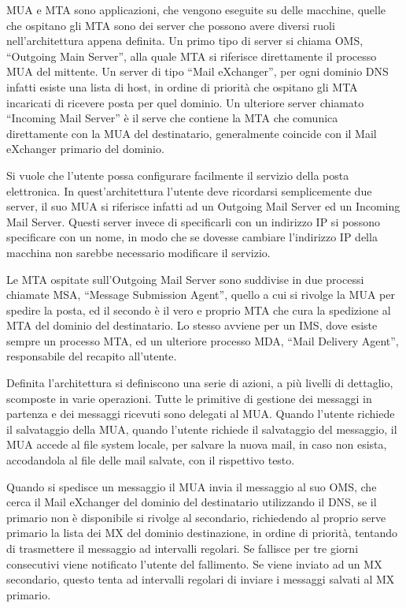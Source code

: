 \documentclass{article}
\numberwithin{equation}{subsection}
\begin{document}
MUA e MTA sono applicazioni, che vengono eseguite su delle macchine, quelle che ospitano gli MTA sono dei server che possono avere diversi ruoli nell'architettura appena definita. Un primo tipo di server si chiama OMS, ``Outgoing Main Server'', alla quale MTA si riferisce direttamente il processo MUA del mittente. 
Un server di tipo ``Mail eXchanger'', per ogni dominio DNS infatti esiste una lista di host, in ordine di priorità che ospitano gli MTA incaricati di ricevere posta per quel dominio. 
Un ulteriore server chiamato ``Incoming Mail Server'' è il serve che contiene la MTA che comunica direttamente con la MUA del destinatario, generalmente coincide con il Mail eXchanger primario del dominio. 

Si vuole che l'utente possa configurare facilmente il servizio della posta elettronica. In quest'architettura l'utente deve ricordarsi semplicemente due server, il suo MUA si riferisce infatti ad un Outgoing Mail Server ed un Incoming Mail Server. Questi server invece di specificarli con un indirizzo IP si possono specificare con un nome, in modo che se dovesse cambiare l'indirizzo IP della macchina non sarebbe necessario modificare il servizio. 

Le MTA ospitate sull'Outgoing Mail Server sono suddivise in due processi chiamate MSA, ``Message Submission Agent'', quello a cui si rivolge la MUA per spedire la posta, ed il secondo è il vero e proprio MTA che cura la spedizione al MTA del dominio del destinatario. Lo stesso avviene per un IMS, dove esiste sempre un processo MTA, ed un ulteriore processo MDA, ``Mail Delivery Agent'', responsabile del recapito all'utente. 


Definita l'architettura si definiscono una serie di azioni, a più livelli di dettaglio, scomposte in varie operazioni. Tutte le primitive di gestione dei messaggi in partenza e dei messaggi ricevuti 
sono delegati al MUA. Quando l'utente richiede il salvataggio della MUA, quando l'utente richiede il salvataggio del messaggio, il MUA accede al file system locale, per salvare la nuova mail, in caso non esista, accodandola al file delle mail salvate, con il rispettivo testo. 

Quando si spedisce un messaggio il MUA invia il messaggio al suo OMS, che cerca il Mail eXchanger del dominio del destinatario utilizzando il DNS, se il primario non è disponibile si rivolge al secondario, richiedendo al proprio serve primario la lista dei MX del dominio destinazione, in ordine di priorità, tentando di trasmettere il messaggio ad intervalli regolari. Se fallisce per tre giorni consecutivi viene notificato l'utente del fallimento. Se viene inviato ad un MX secondario, questo tenta ad intervalli regolari di inviare i messaggi salvati al MX primario. 
\end{document}
